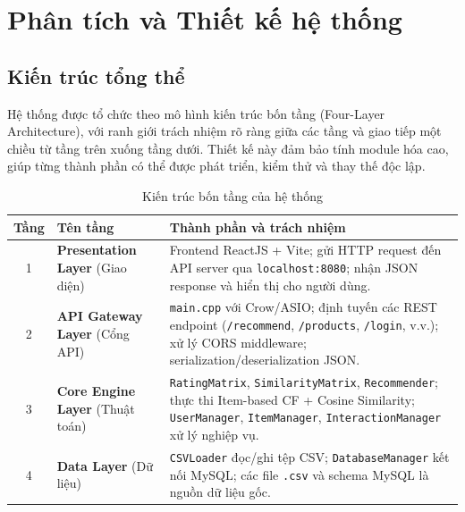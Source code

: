 \documentclass{report}
\begin{document}
\chapter{Phân tích và Thiết kế hệ thống}
\label{chap:phantichvathietke}

\section{Kiến trúc tổng thể}

Hệ thống được tổ chức theo mô hình kiến trúc bốn tầng (Four-Layer Architecture), với ranh giới trách nhiệm rõ ràng giữa các tầng và giao tiếp một chiều từ tầng trên xuống tầng dưới. Thiết kế này đảm bảo tính module hóa cao, giúp từng thành phần có thể được phát triển, kiểm thử và thay thế độc lập.

\begin{table}[H]
    \centering
    \renewcommand{\arraystretch}{1.4}
    \begin{tabularx}{\textwidth}{|c|>{\raggedright\arraybackslash}p{4cm}|>{\raggedright\arraybackslash}X|}
        \hline
        \textbf{Tầng} & \textbf{Tên tầng} & \textbf{Thành phần và trách nhiệm} \\ \hline
        1 & \textbf{Presentation Layer} \newline (Giao diện) & Frontend ReactJS + Vite; gửi HTTP request đến API server qua \texttt{localhost:8080}; nhận JSON response và hiển thị cho người dùng. \\ \hline
        2 & \textbf{API Gateway Layer} \newline (Cổng API) & \texttt{main.cpp} với Crow/ASIO; định tuyến các REST endpoint (\texttt{/recommend}, \texttt{/products}, \texttt{/login}, v.v.); xử lý CORS middleware; serialization/deserialization JSON. \\ \hline
        3 & \textbf{Core Engine Layer} \newline (Thuật toán) & \texttt{RatingMatrix}, \texttt{SimilarityMatrix}, \texttt{Recommender}; thực thi Item-based CF + Cosine Similarity; \texttt{UserManager}, \texttt{ItemManager}, \texttt{InteractionManager} xử lý nghiệp vụ. \\ \hline
        4 & \textbf{Data Layer} \newline (Dữ liệu) & \texttt{CSVLoader} đọc/ghi tệp CSV; \texttt{DatabaseManager} kết nối MySQL; các file \texttt{.csv} và schema MySQL là nguồn dữ liệu gốc. \\ \hline
    \end{tabularx}
    \caption{Kiến trúc bốn tầng của hệ thống}
    \label{tab:kien_truc_4_tang}
\end{table}
\end{document}
